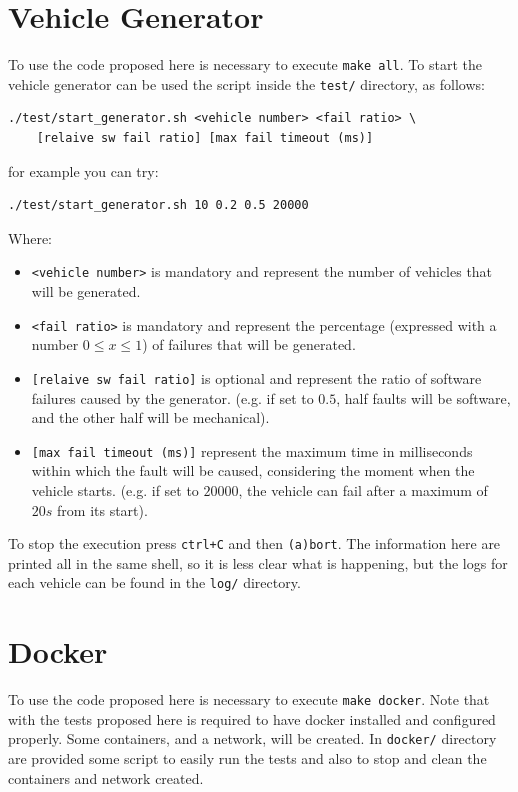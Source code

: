 \documentclass{memoir}
\begin{document}
\section{Vehicle Generator}
To use the code proposed here is necessary to execute \texttt{make all}. To start the vehicle generator can be used the script inside the \texttt{test/} directory, as follows:
\begin{verbatim}
./test/start_generator.sh <vehicle number> <fail ratio> \
	[relaive sw fail ratio] [max fail timeout (ms)]
\end{verbatim}
for example you can try:
\begin{verbatim}
./test/start_generator.sh 10 0.2 0.5 20000
\end{verbatim}
Where:
\begin{itemize}
	\item \verb|<vehicle number>| is mandatory and represent the number of vehicles that will be generated.
	\item \verb|<fail ratio>| is mandatory and represent the percentage (expressed with a number $0 \le x \le 1$) of failures that will be generated.
	\item \verb|[relaive sw fail ratio]| is optional and represent the ratio of software failures caused by the generator. (e.g. if set to $0.5$, half faults will be software, and the other half will be mechanical).
	\item \verb|[max fail timeout (ms)]| represent the maximum time in milliseconds within which the fault will be caused, considering the moment when the vehicle starts. (e.g. if set to $20000$, the vehicle can fail after a maximum of $20s$ from its start).
\end{itemize}
To stop the execution press \verb|ctrl+C| and then \verb|(a)bort|. The information here are printed all in the same shell, so it is less clear what is happening, but the logs for each vehicle can be found in the \verb|log/| directory.

\section{Docker}
To use the code proposed here is necessary to execute \texttt{make docker}. Note that with the tests proposed here is required to have docker installed and configured properly. Some containers, and a network, will be created. In \verb|docker/| directory are provided some script to easily run the tests and also to stop and clean the containers and network created.
\end{document}
